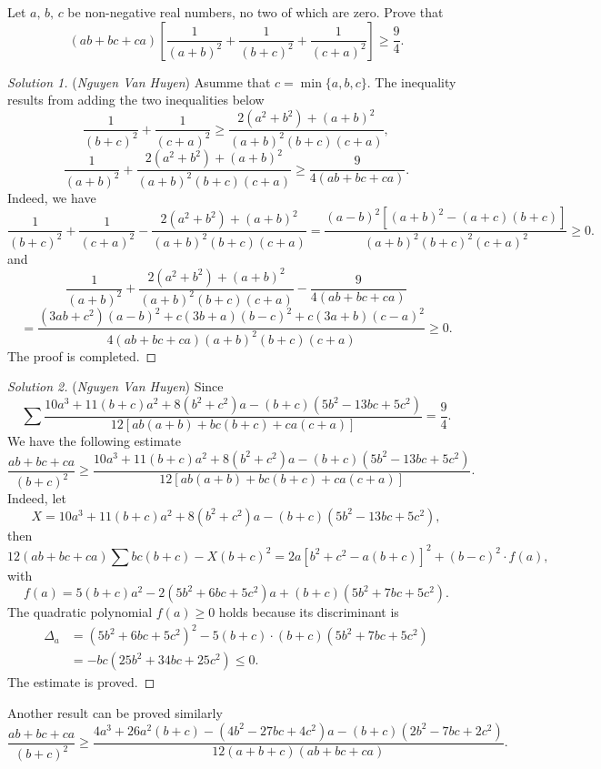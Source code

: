 \documentclass[12pt,a4paper]{book}
\begin{document}
\begin{pro_no_count}
Let $a,\,b,\,c$ be non-negative real numbers, no two of which are zero. Prove that
$$(ab+bc+ca)\left [ \frac{1}{(a+b)^2}+\frac{1}{(b+c)^2}+\frac{1}{(c+a)^2} \right ] \geqslant \frac{9}{4}.$$
\end{pro_no_count}

\begin{proof}[\cmss\problemColor Solution 1] 
(\textit{Nguyen Van Huyen}) Asumme that $c = \min \{a,b,c\}.$ The inequality results from adding the two inequalities below
$$\frac{1}{(b+c)^2}+\frac{1}{(c+a)^2} \geqslant \frac{2(a^2+b^2)+(a+b)^2}{(a+b)^2(b+c)(c+a)},$$
$$\frac{1}{(a+b)^2}+\frac{2(a^2+b^2)+(a+b)^2}{(a+b)^2(b+c)(c+a)} \geqslant \frac{9}{4(ab+bc+ca)}.$$
Indeed, we have
$$\frac{1}{(b+c)^2}+\frac{1}{(c+a)^2} - \frac{2(a^2+b^2)+(a+b)^2}{(a+b)^2(b+c)(c+a)} = \frac{(a-b)^2[(a+b)^2-(a+c)(b+c)]}{(a+b)^2(b+c)^2(c+a)^2} \geqslant 0.$$
and
$$\frac{1}{(a+b)^2}+\frac{2(a^2+b^2)+(a+b)^2}{(a+b)^2(b+c)(c+a)} - \frac{9}{4(ab+bc+ca)}$$
$$ = \frac{(3ab+c^2)(a-b)^2+c(3b+a)(b-c)^2+c(3a+b)(c-a)^2}{4(ab+bc+ca)(a+b)^2(b+c)(c+a)} \geqslant 0.$$
The proof is completed.
\end{proof}

\begin{proof}[\cmss\problemColor Solution 2]
(\textit{Nguyen Van Huyen}) Since
\[\sum \frac{10a^3+11(b+c)a^2+8(b^2+c^2)a-(b+c)(5b^2-13bc+5c^2)}{12[ab(a+b)+bc(b+c)+ca(c+a)]} = \frac{9}{4}.\]
We have the following estimate
\[\frac{ab+bc+ca}{(b+c)^2} \geqslant \frac{10a^3+11(b+c)a^2+8(b^2+c^2)a-(b+c)(5b^2-13bc+5c^2)}{12[ab(a+b)+bc(b+c)+ca(c+a)]}.\]
Indeed, let
\[X = 10a^3+11(b+c)a^2+8(b^2+c^2)a-(b+c)(5b^2-13bc+5c^2),\]
then
\[12(ab+bc+ca) \sum bc(b+c) - X(b+c)^2 = 2a[b^2+c^2-a(b+c)]^2 + (b-c)^2 \cdot f(a),\]
with
\[f(a) = 5(b+c)a^2 - 2(5b^2+6bc+5c^2)a + (b+c)(5b^2+7bc+5c^2).\]
The quadratic polynomial $f(a) \ge 0$ holds because its discriminant is
\[\begin{aligned} 
\Delta_{a} &= (5b^2+6bc+5c^2)^2 - 5(b+c) \cdot (b+c)(5b^2+7bc+5c^2) \\
& = - bc(25b^2+34bc+25c^2) \leqslant 0.
\end{aligned}\]
The estimate is proved.
\end{proof}

\begin{note}
Another result can be proved similarly
\[\frac{ab+bc+ca}{(b+c)^2} \ge \frac{4a^3+26a^2(b+c)-(4b^2-27bc+4c^2)a-(b+c)(2b^2-7bc+2c^2)}{12(a+b+c)(ab+bc+ca)}.\]
\end{note}
\end{document}
